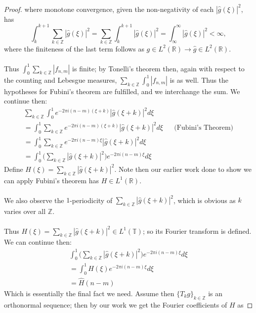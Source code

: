 \documentclass[12pt]{article}
\newenvironment{ex}[2][Exercise]{\begin{trivlist}
\item[\hskip \labelsep {\bfseries #1}\hskip \labelsep {\bfseries #2.}]}{\end{trivlist}}
\begin{document}
\begin{ex}{12}
\begin{proof}
        where monotone convergence, given the non-negativity of each $|\hat{g}(\xi)|^2$, has 
        $$\int_{k}^{k + 1}\sum_{k \in \mathbb{Z}} |\hat{g}(\xi)|^2 = \sum_{k \in \mathbb{Z}} \int_{k}^{k + 1} |\hat{g}(\xi)|^2 = \int_{\infty}^\infty |\hat{g}(\xi)|^2 < \infty,$$
        where the finiteness of the last term follows as $g \in L^2(\mathbb{R}) \rightarrow \hat{g} \in L^2(\mathbb{R})$. \\ \\
        Thus $\int_0^1 \sum_{k \in \mathbb{Z}} |f_{n,m}|$ is finite; by Tonelli's theorem then, again with respect to the counting and Lebesgue measures, $\sum_{k \in \mathbb{Z}} \int_0^1 |f_{n,m}|$ is as well. Thus the hypotheses for Fubini's theorem are fulfilled, and we interchange the sum. We continue then:
        \begin{align*}
            \sum_{k \in \mathbb{Z}} \int_0^1 e^{{-2\pi i}(n - m)(\xi + k)}|\hat{g}(\xi + k)|^2 d\xi \\
            = \int_0^1 \sum_{k \in \mathbb{Z}} e^{{-2\pi i}(n - m)(\xi + k)}|\hat{g}(\xi + k)|^2 d\xi && \text{(Fubini's Theorem)} \\
            = \int_0^1 \sum_{k \in \mathbb{Z}} e^{-2\pi i(n - m)\xi}|\hat{g}(\xi + k)|^2 d\xi \\
            = \int_0^1 \Big ( \sum_{k \in \mathbb{Z}} |\hat{g}(\xi + k)|^2 \Big)e^{-2\pi i(n - m)\xi} d\xi
        \end{align*}
        Define $H(\xi) = \sum_{k \in \mathbb{Z}} |\hat{g}(\xi + k)|^2$. Note then our earlier work done to show we can apply Fubini's theorem has $H \in L^1(\mathbb{R})$. \\ \\
        We also observe the $1$-periodicity of $\sum_{k \in \mathbb{Z}} |\hat{g}(\xi + k)|^2$, which is obvious as $k$ varies over all $\mathbb{Z}$. \\ \\
        Thus $H(\xi) = \sum_{k \in \mathbb{Z}} |\hat{g}(\xi + k)|^2 \in L^1(\mathbb{T})$; so its Fourier transform is defined. We can continue then:
        \begin{align*}
            \int_0^1 \Big ( \sum_{k \in \mathbb{Z}} |\hat{g}(\xi + k)|^2 \Big)e^{-2\pi i(n - m)\xi} d\xi \\
            = \int_0^1 H(\xi)e^{-2\pi i(n - m)\xi}d\xi \\
            = \hat{H}(n -m)
        \end{align*}
        Which is essentially the final fact we need. Assume then $\{T_kg\}_{k \in \mathbb{Z}}$ is an orthonormal sequence; then by our work we get the Fourier coefficients of $H$ as 

\end{proof}
\end{ex}
\end{document}
